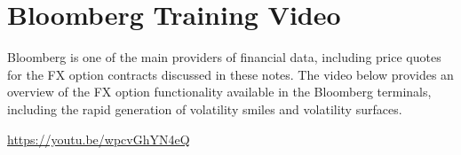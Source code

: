 \documentclass[]{book}
\theoremstyle{definition}
\theoremstyle{definition}
\theoremstyle{definition}
\theoremstyle{remark}
\begin{document}
\chapter{Bloomberg Training Video}\label{bloomberg-training-video}

Bloomberg is one of the main providers of financial data, including
price quotes for the FX option contracts discussed in these notes. The
video below provides an overview of the FX option functionality
available in the Bloomberg terminals, including the rapid generation of
volatility smiles and volatility surfaces.

\url{https://youtu.be/wpcvGhYN4eQ}


\end{document}
